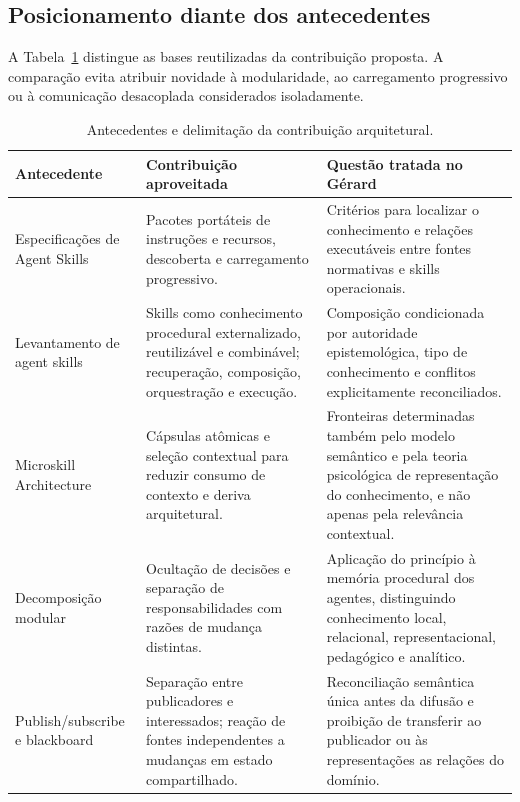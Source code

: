 \documentclass[preprint,12pt,authoryear]{elsarticle}
\begin{document}
\subsection{Posicionamento diante dos antecedentes}

A Tabela~\ref{tab:antecedentes-skills} distingue as bases reutilizadas da contribuição proposta. A comparação evita atribuir novidade à modularidade, ao carregamento progressivo ou à comunicação desacoplada considerados isoladamente.

\begin{table}[ht]
\centering
\small
\caption{Antecedentes e delimitação da contribuição arquitetural.}
\label{tab:antecedentes-skills}
\begin{tabularx}{\textwidth}{p{3.2cm}XX}
\toprule
\textbf{Antecedente} & \textbf{Contribuição aproveitada} & \textbf{Questão tratada no Gérard}\\
\midrule
Especificações de Agent Skills \citep{openai2026skills,microsoft2026skills} & Pacotes portáteis de instruções e recursos, descoberta e carregamento progressivo. & Critérios para localizar o conhecimento e relações executáveis entre fontes normativas e skills operacionais.\\
Levantamento de agent skills \citep{badhe2026survey} & Skills como conhecimento procedural externalizado, reutilizável e combinável; recuperação, composição, orquestração e execução. & Composição condicionada por autoridade epistemológica, tipo de conhecimento e conflitos explicitamente reconciliados.\\
Microskill Architecture \citep{zare2026microskill} & Cápsulas atômicas e seleção contextual para reduzir consumo de contexto e deriva arquitetural. & Fronteiras determinadas também pelo modelo semântico e pela teoria psicológica de representação do conhecimento, e não apenas pela relevância contextual.\\
Decomposição modular \citep{parnas1972criteria} & Ocultação de decisões e separação de responsabilidades com razões de mudança distintas. & Aplicação do princípio à memória procedural dos agentes, distinguindo conhecimento local, relacional, representacional, pedagógico e analítico.\\
Publish/subscribe e blackboard \citep{eugster2003many,nii1986blackboard} & Separação entre publicadores e interessados; reação de fontes independentes a mudanças em estado compartilhado. & Reconciliação semântica única antes da difusão e proibição de transferir ao publicador ou às representações as relações do domínio.\\
\bottomrule
\end{tabularx}
\end{table}
\end{document}
